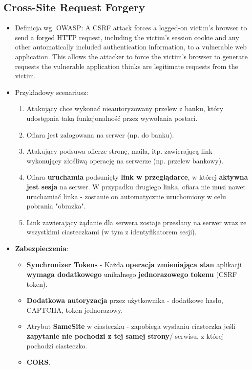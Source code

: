 \documentclass[../main.tex]{subfiles}
\begin{document}
    \subsection{Cross-Site Request Forgery}
    \begin{itemize}
        \item Definicja wg. OWASP: A CSRF attack forces a logged-on victim's browser to send a
        forged HTTP request, including the victim's session cookie and
        any other automatically included authentication information, to a
        vulnerable web application. This allows the attacker to force the
        victim's browser to generate requests the vulnerable application
        thinks are legitimate requests from the victim.
        \item Przykładowy scenariusz:
        \begin{enumerate}
            \item Atakujący chce wykonać nieautoryzowany przelew z banku, który udostępnia
            taką funkcjonalność przez wywołania postaci.
            \item Ofiara jest zalogowana na serwer (np. do banku).
            \item Atakujący podsuwa ofierze stronę, maila, itp. zawierającą link wykonujący
            złośliwą operację na serwerze (np. przelew bankowy).
            \item Ofiara \textbf{uruchamia} podsunięty \textbf{link w przeglądarce}, w której \textbf{aktywna jest sesja}
            na serwer. W przypadku drugiego linka, ofiara nie musi nawet uruchamiać
            linka - zostanie on automatycznie uruchomiony w celu pobrania "obrazka".
            \item Link zawierający żądanie dla serwera zostaje przesłany na serwer wraz ze
            wszystkimi ciasteczkami (w tym z identyfikatorem sesji).
        \end{enumerate}
        \item \textbf{Zabezpieczenia}:
        \begin{itemize}
            \item \textbf{Synchronizer Tokens} - Każda \textbf{operacja zmieniająca stan} aplikacji \textbf{wymaga dodatkowego} unikalnego \textbf{jednorazowego tokenu} (CSRF token).
            \item \textbf{Dodatkowa autoryzacja} przez użytkownika - dodatkowe hasło, CAPTCHA, token jednorazowy.
            \item Atrybut \textbf{SameSite} w ciasteczku - zapobiega wysłaniu ciasteczka jeśli \textbf{zapytanie nie
            pochodzi z tej samej strony}/ serwisu, z której pochodzi ciasteczko.
            \item \textbf{CORS}.
        \end{itemize}
    \end{itemize}
\end{document}
